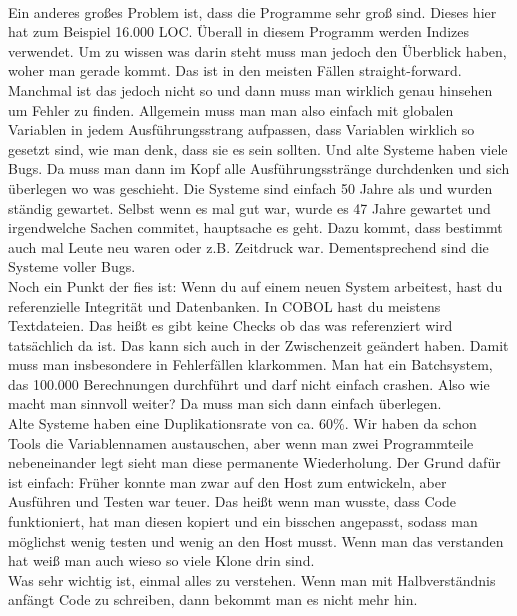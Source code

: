 {\\
Ein anderes großes Problem ist, dass die Programme sehr groß sind. Dieses hier hat zum Beispiel 16.000 LOC. Überall in diesem Programm werden Indizes verwendet. Um zu wissen was darin steht muss man jedoch den Überblick haben, woher man gerade kommt. Das ist in den meisten Fällen straight-forward. Manchmal ist das jedoch nicht so und dann muss man wirklich genau hinsehen um Fehler zu finden. Allgemein muss man man also einfach mit globalen Variablen in jedem Ausführungsstrang aufpassen, dass Variablen wirklich so gesetzt sind, wie man denk, dass sie es sein sollten. Und alte Systeme haben viele Bugs. Da muss man dann im Kopf alle Ausführungsstränge durchdenken und sich überlegen wo was geschieht. Die Systeme sind einfach 50 Jahre als und wurden ständig gewartet. Selbst wenn es mal gut war, wurde es 47 Jahre gewartet und irgendwelche Sachen commitet, hauptsache es geht. Dazu kommt, dass bestimmt auch mal Leute neu waren oder z.B. Zeitdruck war. Dementsprechend sind die Systeme voller Bugs. 
\\
Noch ein Punkt der fies ist: Wenn du auf einem neuen System arbeitest, hast du referenzielle Integrität und Datenbanken. In COBOL hast du meistens Textdateien. Das heißt es gibt keine Checks ob das was referenziert wird tatsächlich da ist. Das kann sich auch in der Zwischenzeit geändert haben. Damit muss man insbesondere in Fehlerfällen klarkommen. Man hat ein Batchsystem, das 100.000 Berechnungen durchführt und darf nicht einfach crashen. Also wie macht man sinnvoll weiter? Da muss man sich dann einfach überlegen. 
\\
Alte Systeme haben eine Duplikationsrate von ca. 60\%. Wir haben da schon Tools die Variablennamen austauschen, aber wenn man zwei Programmteile nebeneinander legt sieht man diese permanente Wiederholung. Der Grund dafür ist einfach: Früher konnte man zwar auf den Host zum entwickeln, aber Ausführen und Testen war teuer. Das heißt wenn man wusste, dass Code funktioniert, hat man diesen kopiert und ein bisschen angepasst, sodass man möglichst wenig testen und wenig an den Host musst. Wenn man das verstanden hat weiß man auch wieso so viele Klone drin sind. 
\\
Was sehr wichtig ist, einmal alles zu verstehen. Wenn man mit Halbverständnis anfängt Code zu schreiben, dann bekommt man es nicht mehr hin. 
}


